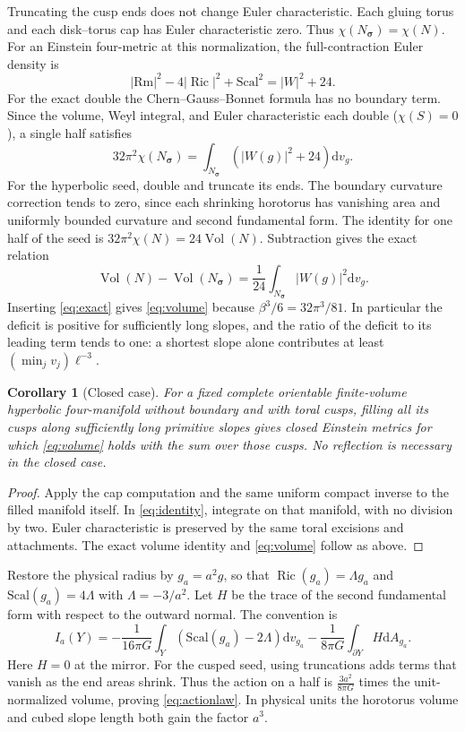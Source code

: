 \documentclass[11pt]{article}
\newtheorem{corollary}[theorem]{Corollary}
\theoremstyle{remark}
\newcommand{\Vol}{\operatorname{Vol}}
\newcommand{\Ric}{\operatorname{Ric}}
\newcommand{\dd}{\mathrm d}
\begin{document}
Truncating the cusp ends does not change Euler characteristic. Each gluing torus and each disk--torus cap has Euler characteristic zero. Thus \(\chi(N_{\boldsymbol\sigma})=\chi(N)\). For an Einstein four-metric at this normalization, the full-contraction Euler density is
\[
 |\mathrm{Rm}|^2-4|\Ric|^2+\mathrm{Scal}^2=|W|^2+24.
\]
For the exact double the Chern--Gauss--Bonnet formula has no boundary term. Since the volume, Weyl integral, and Euler characteristic each double (\(\chi(S)=0\)), a single half satisfies
\[
 32\pi^2\chi(N_{\boldsymbol\sigma})
   =\int_{N_{\boldsymbol\sigma}} (|W(g)|^2+24)\dd v_g .
\]
For the hyperbolic seed, double and truncate its ends. The boundary curvature correction tends to zero, since each shrinking horotorus has vanishing area and uniformly bounded curvature and second fundamental form. The identity for one half of the seed is \(32\pi^2\chi(N)=24\Vol(N)\). Subtraction gives the exact relation
\[
 \Vol(N)-\Vol(N_{\boldsymbol\sigma})
 =\frac1{24}\int_{N_{\boldsymbol\sigma}}|W(g)|^2\dd v_g.
\]
Inserting \eqref{eq:exact} gives \eqref{eq:volume} because \(\beta^3/6=32\pi^3/81\). In particular the deficit is positive for sufficiently long slopes, and the ratio of the deficit to its leading term tends to one: a shortest slope alone contributes at least \((\min_j v_j)\ell^{-3}\).

\begin{corollary}[Closed case]
For a fixed complete orientable finite-volume hyperbolic four-manifold without boundary and with toral cusps, filling all its cusps along sufficiently long primitive slopes gives closed Einstein metrics for which \eqref{eq:volume} holds with the sum over those cusps. No reflection is necessary in the closed case.
\end{corollary}
\begin{proof}
Apply the cap computation and the same uniform compact inverse to the filled manifold itself. In \eqref{eq:identity}, integrate on that manifold, with no division by two. Euler characteristic is preserved by the same toral excisions and attachments. The exact volume identity and \eqref{eq:volume} follow as above.
\end{proof}

Restore the physical radius by \(g_a=a^2g\), so that \(\Ric(g_a)=\Lambda g_a\) and \(\mathrm{Scal}(g_a)=4\Lambda\) with \(\Lambda=-3/a^2\). Let \(H\) be the trace of the second fundamental form with respect to the outward normal. The convention is
\begin{equation}\label{eq:action}
 I_a(Y)=-\frac1{16\pi G}\int_Y(\mathrm{Scal}(g_a)-2\Lambda)\dd v_{g_a}
        -\frac1{8\pi G}\int_{\partial Y}H\dd A_{g_a}.
\end{equation}
Here \(H=0\) at the mirror. For the cusped seed, using truncations adds terms that vanish as the end areas shrink. Thus the action on a half is \(\frac{3a^2}{8\pi G}\) times the unit-normalized volume, proving \eqref{eq:actionlaw}. In physical units the horotorus volume and cubed slope length both gain the factor \(a^3\).
\end{document}
